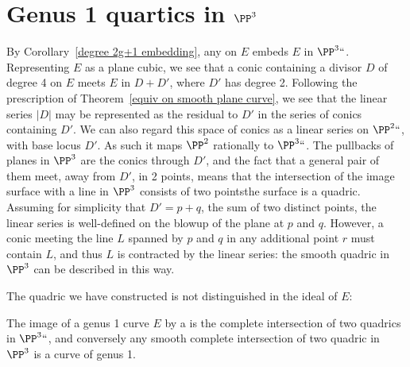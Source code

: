 \section{Genus 1 quartics in $\PP^3$} \label{g=1 in P3}

By Corollary~\ref{degree 2g+1 embedding}, any 
%
on
$E$ embeds $E$ in $\PP^3` `$. Representing $E$ as a plane cubic, we
see that a conic containing a divisor $D$ of degree 4 on $E$ meets $E$
in $D+D'$, where $D'$ has degree 2. 
Following the prescription 
of Theorem~\ref{equiv on smooth plane curve}, we see that the linear series $|D|$ may be represented as the residual to
$D'$ in the
series of conics containing $D'$. We can also regard this space of conics as a linear series on $\PP^2` `$, with base locus $D'$.
As such it maps $\PP^2$ rationally to $\PP^3` `$. The pullbacks of planes in $\PP^3$ are the conics through $D'$, and the fact that a general pair of them meet,
away from $D'$, in 2 points, means that the intersection of the image surface with a line in $\PP^3$ consists of two points\emdash the surface is a quadric. Assuming for simplicity that $D' = p+q$, the sum of two distinct points, the linear series is well-defined on the blowup of the plane at $p$ and $q$. However, a conic meeting the line $L$ spanned by $p$ and $q$ in any additional point $r$ must contain $L$, and thus $L$ is contracted by the linear series: the smooth quadric in $\PP^3$ can be described in this way.

The quadric we have constructed is not distinguished in the ideal of $E$:

\begin{proposition}\label{elliptic quartic as complete intersection}
 The image of a genus 1 curve $E$ by a 
%
%
 is the complete intersection of two quadrics in $\PP^3` `$, and conversely any  smooth complete intersection of two quadric
 in $\PP^3$ is a curve of
 genus 1.
\end{proposition}

